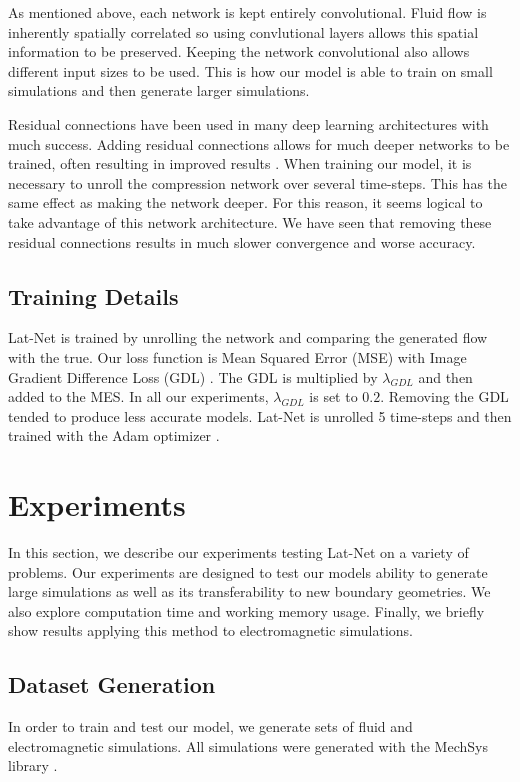 \documentclass{article}
\begin{document}
As mentioned above, each network is kept entirely convolutional. Fluid flow is inherently spatially correlated so using convlutional layers allows this spatial information to be preserved. Keeping the network convolutional also allows different input sizes to be used. This is how our model is able to train on small simulations and then generate larger simulations.

Residual connections have been used in many deep learning architectures with much success. Adding residual connections allows for much deeper networks to be trained, often resulting in improved results \cite{he2016deep}. When training our model, it is necessary to unroll the compression network over several time-steps. This has the same effect as making the network deeper. For this reason, it seems logical to take advantage of this network architecture. We have seen that removing these residual connections results in much slower convergence and worse accuracy.

\subsection{Training Details}

Lat-Net is trained by unrolling the network and comparing the generated flow with the true. Our loss function is Mean Squared Error (MSE) with Image Gradient Difference Loss (GDL) \cite{mathieu2015deep}. The GDL is multiplied by $\lambda_{GDL}$ and then added to the MES. In all our experiments, $\lambda_{GDL}$ is set to $0.2$. Removing the GDL tended to produce less accurate models. Lat-Net is unrolled 5 time-steps and then trained with the Adam optimizer \cite{kingma2014adam}.

\section{Experiments}

In this section, we describe our experiments testing Lat-Net on a variety of problems. Our experiments are designed to test our models ability to generate large simulations as well as its transferability to new boundary geometries. We also explore computation time and working memory usage. Finally, we briefly show results applying this method to electromagnetic simulations.

\subsection{Dataset Generation}
In order to train and test our model, we generate sets of fluid and electromagnetic simulations. All simulations were generated with the MechSys library \cite{mechsys}.
\end{document}
